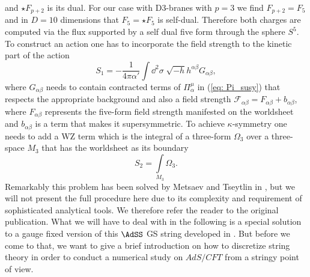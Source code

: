 %
%
and $\star F_{p+2}$ is its  dual. For our case with D3-branes with $p=3$ we find $F_{p+2}=F_{5}$ and in $D=10$ dimensions that $F_{5}=\star F_{5}$ is self-dual. Therefore both charges are computed via the flux supported by a self dual five form through the sphere $S^{5}$. To construct an action one has to incorporate the field strength to the kinetic part of the action 
%
%
\begin{equation}
S_{1} = -\frac{1}{4\pi \alpha'} \int \dd^{2}\sigma\; \sqrt{-h}h^{\alpha\beta} G_{\alpha\beta},
\end{equation}
%
%
where $G_{\alpha\beta}$ needs to contain contracted terms of $\Pi^{\mu}_{\alpha}$ in (\ref{eq: Pi_susy}) that respects the appropriate background and also a field strength $\mathcal{F}_{\alpha\beta} = F_{\alpha\beta}+b_{\alpha\beta}$, where $F_{\alpha\beta}$ represents the five-form field strength manifested on the worldsheet and $b_{\alpha\beta}$ is a term that makes it supersymmetric. To achieve $\kappa$-symmetry one needs to add a WZ term which is the integral of a three-form $\Omega_{3}$ over a three-space $M_{3}$ that has the worldsheet as its boundary
%
%
\begin{equation}
S_{2} = \int\limits_{M_{3}} \Omega_{3}.
\end{equation}
%
%
Remarkably this problem has been solved by Metsaev and Tseytlin in \cite{Metsaev:1998it}, but we will not present the full procedure here due to its complexity and requirement of sophisticated analytical tools. We therefore refer the reader to the original publication. What we will have to deal with in the following is a special solution to a gauge fixed version of this $\AdSS$ GS string developed in \cite{Metsaev:1998it}. But before we come to that, we want to give a brief introduction on how to discretize string theory in order to conduct a numerical study on $AdS/CFT$ from a stringy point of view.
